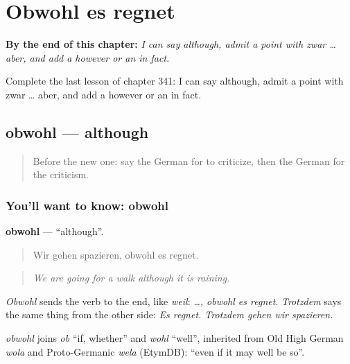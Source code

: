 
\chapter{Obwohl es regnet}
\label{ch:ge-obwohl-es-regnet}

\begin{chapteropening}
\textbf{By the end of this chapter:} \emph{I can say although, admit a point with zwar … aber, and add a however or an in fact.}

Complete the last lesson of chapter 341: I can say although, admit a point with zwar … aber, and add a however or an in fact.
\end{chapteropening}

\section[obwohl]{obwohl — although}

\label{lesson:GE-C341-obwohl}



\begin{quote}
Before the new one: say the German for to criticize, then the German for the criticism.
\end{quote}

\subsection*{You'll want to know: obwohl}
\textbf{obwohl} — \textquotedblleft{}although\textquotedblright{}.

\begin{quote}
Wir gehen spazieren, obwohl es regnet.
\end{quote}

\begin{quote}
\emph{We are going for a walk although it is raining.}
\end{quote}

\emph{Obwohl} sends the verb to the end, like \emph{weil}: \emph{…, obwohl es regnet}. \emph{Trotzdem} says the same thing from the other side: \emph{Es regnet. Trotzdem gehen wir spazieren.}

\begin{cousinweb}
\emph{obwohl} joins \emph{ob} \textquotedblleft{}if, whether\textquotedblright{} and \emph{wohl} \textquotedblleft{}well\textquotedblright{}, inherited from Old High German \emph{wola} and Proto-Germanic \emph{wela} (EtymDB): \textquotedblleft{}even if it may well be so\textquotedblright{}.
\end{cousinweb}

